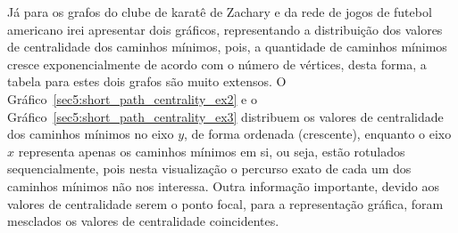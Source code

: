 \begin{table}[!htp]
	\centering
	\caption{Valores de centralidade do grafo simples, Algoritmo~\ref{sec4:funcao_simple_graph_generator}.}
	\label{sec5:centralidade_grafo_teste}
\end{table}

Já para os grafos do clube de karatê de Zachary e da rede de jogos de futebol americano irei apresentar dois gráficos, representando a distribuição dos valores de centralidade dos caminhos mínimos, pois, a quantidade de caminhos mínimos cresce exponencialmente de acordo com o número de vértices, desta forma, a tabela para estes dois grafos são muito extensos. O Gráfico~\ref{sec5:short_path_centrality_ex2} e o Gráfico~\ref{sec5:short_path_centrality_ex3} distribuem os valores de centralidade dos caminhos mínimos no eixo $y$, de forma ordenada (crescente), enquanto o eixo $x$ representa apenas os caminhos mínimos em si, ou seja, estão rotulados sequencialmente, pois nesta visualização o percurso exato de cada um dos caminhos mínimos não nos interessa. Outra informação importante, devido aos valores de centralidade serem o ponto focal, para a representação gráfica, foram mesclados os valores de centralidade coincidentes.

